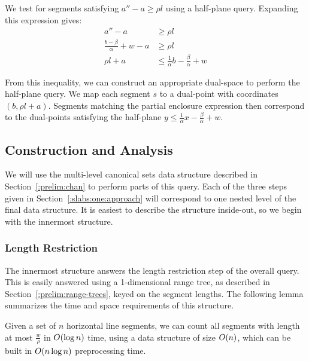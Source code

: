 We test for segments satisfying $a'' - a \geq \rho l$ using a half-plane query.  Expanding this expression gives:
\[
\begin{split}
a'' - a &\geq \rho l \\
%
\frac{b - \beta}{\alpha} + w - a &\geq \rho l \\
%
\rho l + a &\leq \frac{1}{\alpha} b - \frac{\beta}{\alpha} + w
%
\end{split}
\]

From this inequality, we can construct an appropriate dual-space to perform the half-plane query.  
We map each segment $s$ to a dual-point with coordinates $(b, \rho l + a)$. 
Segments matching the partial enclosure expression then correspond to the dual-points satisfying the half-plane $y \leq \frac{1}{\alpha} x - \frac{\beta}{\alpha} + w$.

\subsection{Construction and Analysis}
\label{:slabs:one:analysis}

We will use the multi-level canonical sets data structure described in Section~\ref{:prelim:chan} to perform parts of this query.
Each of the three steps given in Section~\ref{:slabs:one:approach} will correspond to one nested level of the final data structure.
It is easiest to describe the structure inside-out, so we begin with the innermost structure.


\subsubsection{Length Restriction}

The innermost structure answers the length restriction step of the overall query. This is easily answered using a 1-dimensional range tree, as described in Section~\ref{:prelim:range-trees}, keyed on the segment lengths. The following lemma summarizes the time and space requirements of this structure.

\begin{lemma}
\label{lem:slabs:one:step1}
Given a set of $n$ horizontal line segments, we can count all segments with length at most $\frac{w}{\rho}$ in $O\!\left(\log{n}\right)$ time, using a data structure of size $O\!\left(n\right)$, which can be built in $O\!\left(n \log{n}\right)$ preprocessing time.
\end{lemma}



